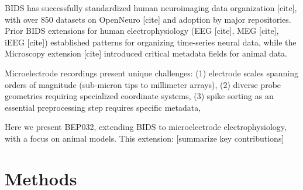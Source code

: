 \documentclass[fleqn,10pt]{wlscirep}
\begin{document}
BIDS has successfully standardized human neuroimaging data organization [cite],
with over 850 datasets on OpenNeuro [cite] and adoption by major repositories.
Prior BIDS extensions for human electrophysiology (EEG [cite], MEG [cite], iEEG [cite])
established patterns for organizing time-series neural data, while the Microscopy extension [cite]
introduced critical metadata fields for animal data.

Microelectrode recordings present unique challenges:
(1) electrode scales spanning orders of magnitude (sub-micron tips to millimeter arrays),
(2) diverse probe geometries requiring specialized coordinate systems,
(3) spike sorting as an essential preprocessing step requires specific metadata,

Here we present BEP032, extending BIDS to microelectrode electrophysiology, with a focus on animal models.
This extension: [summarize key contributions]


\section*{Methods}


\end{document}
